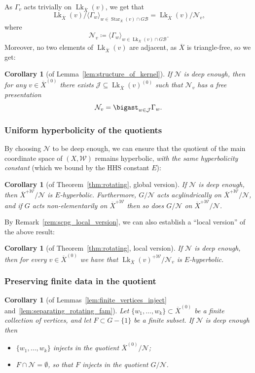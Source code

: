 \documentclass[svgnames]{amsart}
\theoremstyle{plain}
\newtheorem{cor}[thm]{Corollary}
\theoremstyle{definition}
\newcommand{\ov}[1]{\overline{#1}}
\newcommand{\link}{\operatorname{Lk}}
\newcommand{\N}{\mathcal{N}}
\newcommand{\B}{\mathcal{B}}
\newcommand{\W}{\mathcal{W}}
\begin{document}
As $\Gamma_v$ acts trivially on $\link_{\ov X}(v)$, we get that
$$\link_{\ov X}(v)/\langle \Gamma_w\rangle_{w\in\operatorname{Star}_{\ov X}(v)\cap G\B}=\link_{\ov X}(v)/\N_v,$$
where $$\N_v\coloneq \langle \Gamma_w\rangle_{w\in\link_{\ov X}(v)\cap G\B}.$$
Moreover, no two elements of $\link_{\ov X}(v)$ are adjacent, as $\ov X$ is triangle-free, so we get:
 \begin{cor}[of Lemma~\ref{lem:structure_of_kernel}]\label{cor:Nv_free_prod}
     If $\N$ is deep enough, then for any $v\in \ov{X}^{(0)}$ there exists $\mathcal J\subseteq\link_{\ov X}(v)^{(0)}$ such that $\N_v$ has a free presentation
     $$\N_v=\bigast_{w\in \mathcal J} \Gamma_w.$$
 \end{cor}


\subsubsection{Uniform hyperbolicity of the quotients}
By choosing $\N$ to be deep enough, we can ensure that the quotient of the main coordinate space of $(X,\W)$ remains hyperbolic, \emph{with the same hyperbolicity constant} (which we bound by the HHS constant $E$):
\begin{cor}[of Theorem~\ref{thm:rotating}, global version]\label{cor:hyp_quotients_from_rotating} If $\N$ is deep enough, then $\ov X^{+\W}/\N$ is $E$-hyperbolic. 
Furthermore,  $G/\N$ acts acylindrically on $\ov X^{+\W}/\N$, and if $G$ acts non-elementarily on $\ov X^{+\W}$ then so does $G/\N$ on $\ov X^{+\W}/\N$.
\end{cor}






By Remark~\ref{rem:scpg_local_version}, we can also establish a “local version” of the above result:
\begin{cor}[of Theorem~\ref{thm:rotating}, local version]\label{cor:local_hyp_quotients_from_rotating} If $\N$ is deep enough, then for every $v\in \ov{X}^{(0)}$ we have that $\link_{\ov X}(v)^{+\W}/\N_v$ is $E$-hyperbolic.
\end{cor}


\subsubsection{Preserving finite data in the quotient}
\begin{cor}[of Lemmas~\ref{lem:finite_vertices_inject} and~\ref{lem:separating_rotating_fam}]\label{cor:separating_filling}
    Let $\{w_1,\ldots,w_k\}\subset \ov X^{(0)}$ be a finite collection of vertices, and let $F\subset G-\{1\}$ be a finite subset.  If $\N$ is deep enough then
    \begin{itemize}
        \item $\{w_1,\ldots,w_k\}$ injects in the quotient $\ov X^{(0)}/\N$;
        \item $F\cap \N=\emptyset$, so that $F$ injects in the quotient $G/\N$.
    \end{itemize}
\end{cor}
\end{document}
